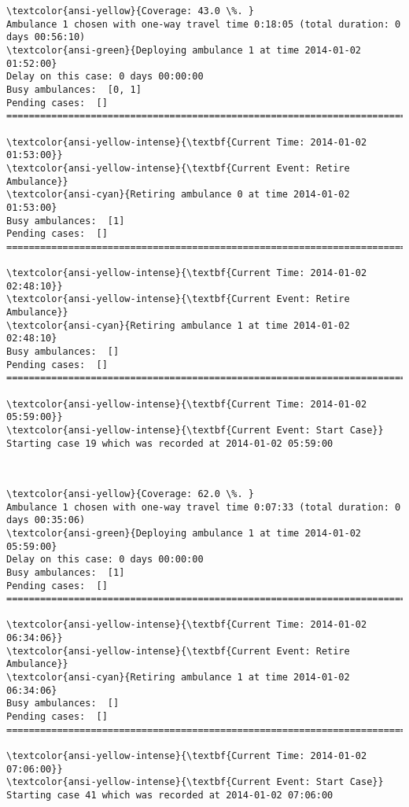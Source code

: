 \documentclass[11pt]{article}
\begin{document}
    \begin{Verbatim}[commandchars=\\\{\}]
\textcolor{ansi-yellow}{Coverage: 43.0 \%. }
Ambulance 1 chosen with one-way travel time 0:18:05 (total duration: 0 days 00:56:10)
\textcolor{ansi-green}{Deploying ambulance 1 at time 2014-01-02 01:52:00}
Delay on this case: 0 days 00:00:00
Busy ambulances:  [0, 1]
Pending cases:  []
========================================================================

\textcolor{ansi-yellow-intense}{\textbf{Current Time: 2014-01-02 01:53:00}}
\textcolor{ansi-yellow-intense}{\textbf{Current Event: Retire Ambulance}}
\textcolor{ansi-cyan}{Retiring ambulance 0 at time 2014-01-02 01:53:00}
Busy ambulances:  [1]
Pending cases:  []
========================================================================

\textcolor{ansi-yellow-intense}{\textbf{Current Time: 2014-01-02 02:48:10}}
\textcolor{ansi-yellow-intense}{\textbf{Current Event: Retire Ambulance}}
\textcolor{ansi-cyan}{Retiring ambulance 1 at time 2014-01-02 02:48:10}
Busy ambulances:  []
Pending cases:  []
========================================================================

\textcolor{ansi-yellow-intense}{\textbf{Current Time: 2014-01-02 05:59:00}}
\textcolor{ansi-yellow-intense}{\textbf{Current Event: Start Case}}
Starting case 19 which was recorded at 2014-01-02 05:59:00

    \end{Verbatim}

    \begin{center}
    \end{center}
    { \hspace*{\fill} \\}
    
    \begin{Verbatim}[commandchars=\\\{\}]
\textcolor{ansi-yellow}{Coverage: 62.0 \%. }
Ambulance 1 chosen with one-way travel time 0:07:33 (total duration: 0 days 00:35:06)
\textcolor{ansi-green}{Deploying ambulance 1 at time 2014-01-02 05:59:00}
Delay on this case: 0 days 00:00:00
Busy ambulances:  [1]
Pending cases:  []
========================================================================

\textcolor{ansi-yellow-intense}{\textbf{Current Time: 2014-01-02 06:34:06}}
\textcolor{ansi-yellow-intense}{\textbf{Current Event: Retire Ambulance}}
\textcolor{ansi-cyan}{Retiring ambulance 1 at time 2014-01-02 06:34:06}
Busy ambulances:  []
Pending cases:  []
========================================================================

\textcolor{ansi-yellow-intense}{\textbf{Current Time: 2014-01-02 07:06:00}}
\textcolor{ansi-yellow-intense}{\textbf{Current Event: Start Case}}
Starting case 41 which was recorded at 2014-01-02 07:06:00

    \end{Verbatim}
\end{document}

